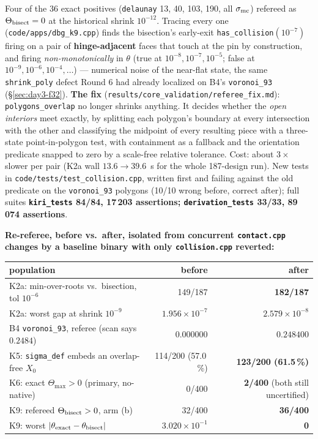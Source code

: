 \documentclass[10pt,a4paper]{article}
\newcommand{\fn}[1]{\nolinkurl{#1}}
\begin{document}
Four of the 36 exact positives (\fn{delaunay} 13, 40, 103, 190, all $\sigma_{\rm mc}$) refereed as
$\Theta_{\rm bisect}=0$ at the historical shrink $10^{-12}$. Tracing every one
(\fn{code/apps/dbg\_k9.cpp}) finds the bisection's early-exit \fn{has\_collision}$(10^{-7})$
firing on a pair of \textbf{hinge-adjacent} faces that touch at the pin by construction, and firing
\emph{non-monotonically} in $\theta$ (true at $10^{-8},10^{-7},10^{-5}$; false at
$10^{-9},10^{-6},10^{-4},\dots$) --- numerical noise of the near-flat state, the same
\fn{shrink\_poly} defect Round 6 had already localized on B4's \fn{voronoi\_93}
(\S\ref{sec:day3-f32}). \textbf{The fix} (\fn{results/core\_validation/referee\_fix.md}):
\fn{polygons\_overlap} no longer shrinks anything. It decides whether the \emph{open interiors}
meet exactly, by splitting each polygon's boundary at every intersection with the other and
classifying the midpoint of every resulting piece with a three-state point-in-polygon test, with
containment as a fallback and the orientation predicate snapped to zero by a scale-free relative
tolerance. Cost: about $3\times$ slower per pair (K2a wall $13.6\to39.6$~s for the whole 187-design
run). New tests in \fn{code/tests/test\_collision.cpp}, written first and failing against the old
predicate on the \fn{voronoi\_93} polygons (10/10 wrong before, correct after); full suites
\textbf{\fn{kiri\_tests} 84/84, 17\,203 assertions; \fn{derivation\_tests} 33/33, 89\,074
assertions}.

\textbf{Re-referee, before vs.\ after, isolated from concurrent \fn{contact.cpp} changes by a
baseline binary with only \fn{collision.cpp} reverted:}

\begin{center}\footnotesize
\begin{tabular}{@{}lrr@{}}
\toprule
population & before & after \\
\midrule
K2a: min-over-roots vs.\ bisection, tol $10^{-6}$ & 149/187 & \textbf{182/187} \\
K2a: worst gap at shrink $10^{-9}$ & $1.956\times10^{-7}$ & \textbf{$2.579\times10^{-8}$} \\
B4 \fn{voronoi\_93}, referee (scan says $0.2484$) & $0.000000$ & \textbf{$0.248400$} \\
K5: \fn{sigma\_def} embeds an overlap-free $X_0$ & 114/200 (57.0\,\%) & \textbf{123/200 (61.5\,\%)} \\
K6: exact $\Theta_{\max}>0$ (primary, no-native) & 0/400 & \textbf{2/400} (both still uncertified) \\
K9: refereed $\Theta_{\rm bisect}>0$, arm (b) & 32/400 & \textbf{36/400} \\
K9: worst $|\theta_{\rm exact}-\theta_{\rm bisect}|$ & $3.020\times10^{-1}$ & \textbf{0} \\
\bottomrule
\end{tabular}
\end{center}
\end{document}
